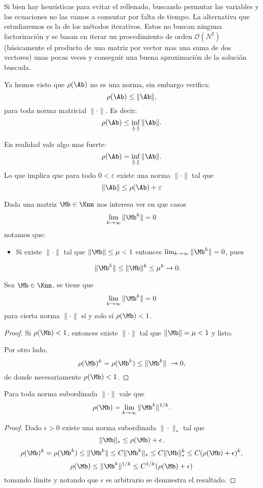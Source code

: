 Si bien hay heurísticas para evitar el rellenado, buscando permutar las variables y las ecuaciones no las vamos a comentar por falta de tiempo. La alternativa que estudiaremos es la de los métodos iterativos. Estos no buscan ninguna factorización y se basan en iterar un procedimiento de orden $\mathcal{O}(N^2)$ (básicamente el producto de una matriz por vector mas una suma de dos vectores) unas pocas veces y conseguir una buena aproximación de la solución buscada.


Ya hemos visto que $\rho(\Ab)$ no es una norma, sin embargo verifica:
$$\rho(\Ab)\le \|\Ab\|,$$
para toda norma matricial $\|\cdot\|$.
Es decir:
$$
\rho(\Ab)\le\inf_{\|\cdot\|} \|\Ab\|.
$$

En realidad vale algo mas fuerte:
$$
\rho(\Ab)=\inf_{\|\cdot\|} \|\Ab\|.
$$
Lo que implica que para todo $0<\varepsilon$ existe una norma $\|\cdot\|$ tal que
$$\|\Ab\|\le \rho(\Ab)+ \varepsilon$$


Dada una matriz $\Mb\in \Knn$ nos interesa ver en que casos
$$
\lim_{k\to \infty}
\|\Mb^k\|=0
$$
notamos que:
\begin{itemize}
 \item Si existe $\|\cdot\|$ tal que
 $\|\Mb\|\le \mu <1$ entonces $\lim_{k\to \infty}
\|\Mb^k\|=0$, pues

$$\|\Mb^k\|\le \|\Mb\|^k\le \mu^k\to 0.$$
\end{itemize}


\tcc
\begin{prop}
 Sea $\Mb\in \Knn$, se tiene que
 $$
 \lim_{k\to \infty}\|\Mb^k\|=0
 $$
para cierta norma $\|\cdot\|$ sí y solo sí
 $\rho(\Mb)<1$.
\end{prop}

\etcc

\begin{proof}
 Si $\rho(\Mb)<1$, entonces existe $\|\cdot\|$ tal que $\|\Mb\|=\mu<1$ y listo.

 Por otro lado,
 $$
 \rho(\Mb)^k=
 \rho(\Mb^k)\le
 \|\Mb^k\|\ \to 0,
 $$
 de donde
 necesariamente
 $\rho(\Mb)<1$.
\end{proof}

\tcc
\begin{prop}
 Para toda norma subordinada $\|\cdot\|$ vale que
 $$
 \rho(\Mb)=\lim_{k\to \infty} \|\Mb^k\|^{1/k}.
 $$
\end{prop}

\etcc


\begin{proof}
 Dado $\epsilon>0$ existe una norma subordinada $\|\cdot\|_{*}$ tal que
 $$
 \|\Mb\|_{*}\le \rho(\Mb)+\epsilon.
 $$
 $$
 \rho(\Mb)^k=\rho(\Mb^k)\le \|\Mb^k\|\le C \|\Mb^k\|_{*}\le C \|\Mb\|^k_{*}\le C(\rho(\Mb)+\epsilon)^k,
 $$
 $$
 \rho(\Mb)\le \|\Mb^k\|^{1/k}\le C^{1/k}(\rho(\Mb)+\epsilon)
 $$
 tomando límite y notando que $\epsilon$ es arbitrario se demuestra el resultado.
\end{proof}

